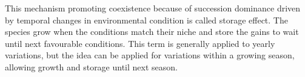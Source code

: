 \begin{figure}%
    \classiccaptionstyle
{}
\end{figure}

This mechanism promoting coexistence because of succession dominance driven by temporal changes in environmental condition is called storage effect. The species grow when the conditions match their niche and store the gains to wait until next favourable conditions. This term is generally applied to yearly variations, but the idea can be applied for variations within a growing season, allowing growth and storage until next season.

%
%
%
%
%
%

 
